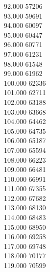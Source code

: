{ 92.000	57206 \\
 93.000	59691 \\
 94.000	60097 \\
 95.000	60447 \\
 96.000	60771 \\
 97.000	61231 \\
 98.000	61548 \\
 99.000	61962 \\
 100.000	62336 \\
 101.000	62711 \\
 102.000	63188 \\
 103.000	63668 \\
 104.000	64462 \\
 105.000	64735 \\
 106.000	65187 \\
 107.000	65594 \\
 108.000	66223 \\
 109.000	66481 \\
 110.000	66991 \\
 111.000	67355 \\
 112.000	67682 \\
 113.000	68130 \\
 114.000	68483 \\
 115.000	68950 \\
 116.000	69258 \\
 117.000	69748 \\
 118.000	70177 \\
 119.000	70599 \\
}
